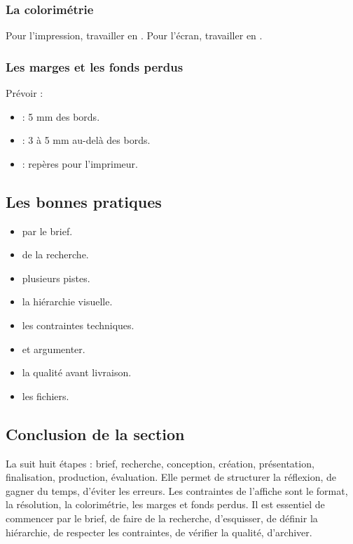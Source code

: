\subsubsection{La colorimétrie}

Pour l'impression, travailler en . Pour l'écran, travailler en .

\subsubsection{Les marges et les fonds perdus}

Prévoir :

\begin{itemize}
    \item {} : 5 mm des bords.
    \item {} : 3 à 5 mm au-delà des bords.
    \item {} : repères pour l'imprimeur.
\end{itemize}

\subsection{Les bonnes pratiques}

\begin{itemize}
    \item {} par le brief.
    \item {} de la recherche.
    \item {} plusieurs pistes.
    \item {} la hiérarchie visuelle.
    \item {} les contraintes techniques.
    \item {} et argumenter.
    \item {} la qualité avant livraison.
    \item {} les fichiers.
\end{itemize}

\subsection*{Conclusion de la section}

La  suit huit étapes : brief, recherche, conception, création, présentation, finalisation, production, évaluation. Elle permet de structurer la réflexion, de gagner du temps, d'éviter les erreurs. Les contraintes de l'affiche sont le format, la résolution, la colorimétrie, les marges et fonds perdus. Il est essentiel de commencer par le brief, de faire de la recherche, d'esquisser, de définir la hiérarchie, de respecter les contraintes, de vérifier la qualité, d'archiver.

